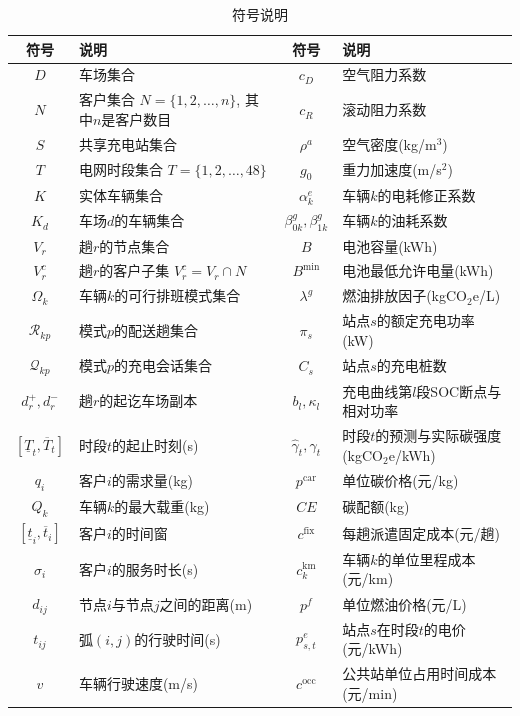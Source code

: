 \documentclass{setp-new}
\newcommand{\setpsymtabsetup}{\fontsize{9pt}{10.5pt}\selectfont\renewcommand{\arraystretch}{0.95}\setlength{\tabcolsep}{2.0pt}\setlength{\aboverulesep}{0.4pt}\setlength{\belowrulesep}{0.4pt}\hbadness=10000}
\begin{document}
\begin{table}[H]
\centering
\caption{符号说明}
\label{tab:symbols}
\setpsymtabsetup
\begin{tabular*}{\linewidth}{@{\extracolsep{\fill}}cJcJ@{}}
\toprule
符号 & 说明 & 符号 & 说明\\
\midrule
$D$ & 车场集合 & $c_D$ & 空气阻力系数\\
$N$ & 客户集合 $N=\{1,2,\dots,n\}$, 其中$n$是客户数目 & $c_R$ & 滚动阻力系数\\
$S$ & 共享充电站集合 & $\rho^a$ & 空气密度(kg/m$^3$)\\
$T$ & 电网时段集合 $T=\{1,2,\dots,48\}$ & $g_0$ & 重力加速度(m/s$^2$)\\
$K$ & 实体车辆集合 & $\alpha_k^e$ & 车辆$k$的电耗修正系数\\
$K_d$ & 车场$d$的车辆集合 & $\beta_{0k}^g,\beta_{1k}^g$ & 车辆$k$的油耗系数\\
$V_r$ & 趟$r$的节点集合 & $B$ & 电池容量(kWh)\\
$V_r^c$ & 趟$r$的客户子集 $V_r^c=V_r\cap N$ & $B^{\min}$ & 电池最低允许电量(kWh)\\
$\Omega_k$ & 车辆$k$的可行排班模式集合 & $\lambda^g$ & 燃油排放因子(kgCO$_2$e/L)\\
$\mathcal R_{kp}$ & 模式$p$的配送趟集合 & $\pi_s$ & 站点$s$的额定充电功率(kW)\\
$\mathcal Q_{kp}$ & 模式$p$的充电会话集合 & $C_s$ & 站点$s$的充电桩数\\
$d_r^+,d_r^-$ & 趟$r$的起讫车场副本 & $b_l,\kappa_l$ & 充电曲线第$l$段SOC断点与相对功率\\
$[\underline T_t,\overline T_t]$ & 时段$t$的起止时刻(s) & $\widehat\gamma_t,\gamma_t$ & 时段$t$的预测与实际碳强度(kgCO$_2$e/kWh)\\
$q_i$ & 客户$i$的需求量(kg) & $p^{\mathrm{car}}$ & 单位碳价格(元/kg)\\
$Q_k$ & 车辆$k$的最大载重(kg) & $CE$ & 碳配额(kg)\\
$[\underline t_i,\overline t_i]$ & 客户$i$的时间窗 & $c^{\mathrm{fix}}$ & 每趟派遣固定成本(元/趟)\\
$\sigma_i$ & 客户$i$的服务时长(s) & $c_k^{\mathrm{km}}$ & 车辆$k$的单位里程成本(元/km)\\
$d_{ij}$ & 节点$i$与节点$j$之间的距离(m) & $p^f$ & 单位燃油价格(元/L)\\
$t_{ij}$ & 弧$(i,j)$的行驶时间(s) & $p_{s,t}^{e}$ & 站点$s$在时段$t$的电价(元/kWh)\\
$v$ & 车辆行驶速度(m/s) & $c^{\mathrm{occ}}$ & 公共站单位占用时间成本(元/min)\\

\end{tabular*}
\end{table}
\end{document}
